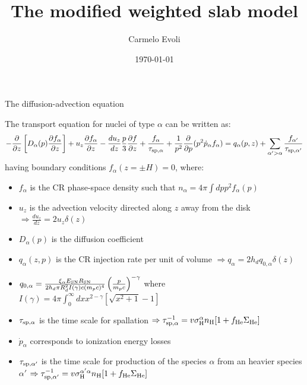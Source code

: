 \documentclass[9pt]{beamer}
\author[C.~Evoli]{Carmelo Evoli}
\institute[GSSI]{Gran Sasso Science Institute}
\title[The modified weighted slab model]{The modified weighted slab model}
\date[2019]{\today}
\begin{document}
\small

\begin{frame}
\titlepage
\end{frame}


\begin{frame}{The diffusion-advection equation}

The transport equation for nuclei of type $\alpha$ can be written as:
%
\begin{equation}\label{eq:transport}
-\frac{\partial}{\partial z} \left[ D_{\alpha}(p) \frac{\partial f_\alpha}{\partial z} \right]
+ u_z \frac{\partial f_\alpha}{\partial z}
- \frac{du_z}{dz} \frac{p}{3} \frac{\partial f}{\partial z}
+ \frac{f_\alpha}{\tau_{\rm sp,\alpha}}
+ \frac{1}{p^2} \frac{\partial}{\partial p}(p^2 \dot{p}_\alpha f_\alpha )
= q_\alpha(p,z) + \sum_{\alpha'>\alpha} \frac{f_{\alpha'}}{\tau_{\rm sp, \alpha'}}
\end{equation}
%
having boundary conditions $f_\alpha(z = \pm H) = 0$, where:

\begin{itemize}
\item $f_\alpha$ is the CR phase-space density such that $n_\alpha = 4 \pi \int dp p^2 f_\alpha(p)$
\item $u_z$ is the advection velocity directed along $z$ away from the disk $\Rightarrow \frac{du_z}{dz} = 2u_z\delta(z)$
\item $D_\alpha(p)$ is the diffusion coefficient
\item $q_\alpha(z, p)$ is the CR injection rate per unit of volume $\Rightarrow q_\alpha = 2h_d q_{0,\alpha} \delta(z)$
\item $q_{0,\alpha} = \frac{\xi_\alpha E_{\rm SN} R_{\rm SN}}{2 h_d \pi R_d^2 I(\gamma)c(m_pc)^4} \left(\frac{p}{m_pc}\right)^{-\gamma}$ where $I(\gamma) = 4\pi \int_0^\infty dx x^{2-\gamma} \left[\sqrt{x^2+1}-1\right]$
\item $\tau_{\rm sp, \alpha}$ is the time scale for spallation $\Rightarrow \tau_{\rm sp, \alpha}^{-1} = v \sigma_{\rm H}^\alpha n_{\rm H} [1 + f_{\rm He} \Sigma_{\rm He}]$
\item $\dot{p}_\alpha$ corresponds to ionization energy losses 
\item $\tau_{\rm sp, \alpha'}$ is the time scale for production of the species $\alpha$ from an heavier species $\alpha'$ $\Rightarrow \tau_{\rm sp, \alpha'}^{-1} = v \sigma_{\rm H}^{\alpha' \alpha} n_{\rm H} [1 + f_{\rm He} \Sigma_{\rm He}]$
\end{itemize}
\end{frame}
\end{document}
